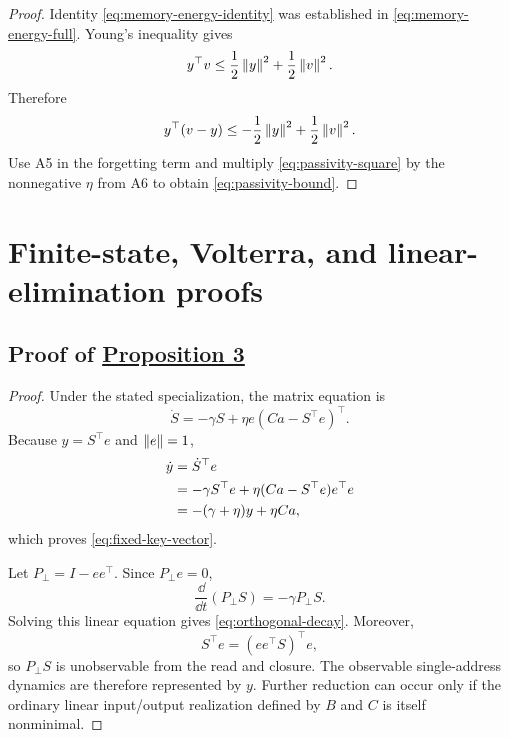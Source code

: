\begin{proof}
Identity \eqref{eq:memory-energy-identity} was established in
\eqref{eq:memory-energy-full}. Young's inequality gives
\begin{equation}
 y^\top v
 \le\frac12\left\lVert y\right\rVert^2+\frac12\left\lVert v\right\rVert^2.
 \label{eq:young-yv}
\end{equation}
Therefore
\begin{equation}
 y^\top(v-y)
 \le-\frac12\left\lVert y\right\rVert^2+\frac12\left\lVert v\right\rVert^2.
 \label{eq:passivity-square}
\end{equation}
Use A5 in the forgetting term and multiply
\eqref{eq:passivity-square} by the nonnegative $\eta$ from A6 to obtain
\eqref{eq:passivity-bound}.
\end{proof}

\section{Finite-state, Volterra, and linear-elimination proofs}
\label{app:finite-state}

\subsection{Proof of \hyperref[prop:fixed-key]{Proposition 3}}
\label{app:fixed-key}

\begin{proof}
Under the stated specialization, the matrix equation is
\begin{equation}
 \dot S=-\gamma S+\eta e(Ca-S^\top e)^\top.
 \label{eq:fixed-key-matrix}
\end{equation}
Because $y=S^\top e$ and $\left\lVert e\right\rVert=1$,
\begin{align}
 \dot y
 &=\dot S^\top e \notag\\
 &=-\gamma S^\top e+
 \eta(Ca-S^\top e)e^\top e \notag\\
 &=-(\gamma+\eta)y+\eta Ca,
 \label{eq:fixed-key-proof}
\end{align}
which proves \eqref{eq:fixed-key-vector}.

Let $P_\perp=I-ee^\top$. Since $P_\perp e=0$,
\begin{equation}
 \frac{\dd}{\dd t}(P_\perp S)
 =-\gamma P_\perp S.
 \label{eq:orthogonal-equation}
\end{equation}
Solving this linear equation gives \eqref{eq:orthogonal-decay}. Moreover,
\begin{equation}
 S^\top e=(ee^\top S)^\top e,
 \label{eq:read-projection}
\end{equation}
so $P_\perp S$ is unobservable from the read and closure. The observable
single-address dynamics are therefore represented by $y$. Further reduction
can occur only if the ordinary linear input/output realization defined by
$B$ and $C$ is itself nonminimal.
\end{proof}

